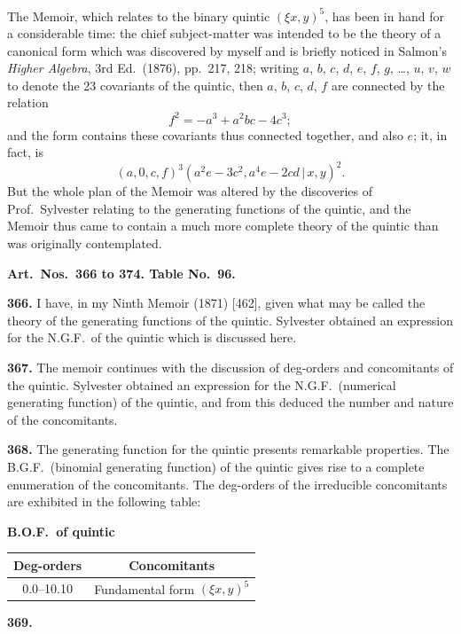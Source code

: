 \documentclass[12pt,a4paper]{article}
\theoremstyle{definition}
\begin{document}
The Memoir, which relates to the binary quintic $(\xi x, y)^5$, has been in hand for a considerable time: the chief subject-matter was intended to be the theory of a canonical form which was discovered by myself and is briefly noticed in Salmon's \textit{Higher Algebra}, 3rd Ed.\ (1876), pp.\ 217, 218; writing $a$, $b$, $c$, $d$, $e$, $f$, $g$, \dots, $u$, $v$, $w$ to denote the 23 covariants of the quintic, then $a$, $b$, $c$, $d$, $f$ are connected by the relation
\[
f^2 = -a^3 + a^2bc - 4c^3;
\]
and the form contains these covariants thus connected together, and also $e$; it, in fact, is
\[
(a, 0, c, f)^3(a^2e - 3c^2, a^4e - 2cd\,|\,x, y)^2.
\]
But the whole plan of the Memoir was altered by the discoveries of Prof.\ Sylvester relating to the generating functions of the quintic, and the Memoir thus came to contain a much more complete theory of the quintic than was originally contemplated.

\medskip
\noindent\textbf{Art.\ Nos.\ 366 to 374. Table No.\ 96.}

\medskip
\noindent\textbf{366.}\quad
I have, in my Ninth Memoir (1871) [462], given what may be called the theory of the generating functions of the quintic. Sylvester obtained an expression for the N.G.F.\ of the quintic which is discussed here.

\medskip
\noindent\textbf{367.}\quad
The memoir continues with the discussion of deg-orders and concomitants of the quintic. Sylvester obtained an expression for the N.G.F.\ (numerical generating function) of the quintic, and from this deduced the number and nature of the concomitants.

\medskip
\noindent\textbf{368.}\quad
The generating function for the quintic presents remarkable properties. The B.G.F.\ (binomial generating function) of the quintic gives rise to a complete enumeration of the concomitants. The deg-orders of the irreducible concomitants are exhibited in the following table:

\begin{center}
\textbf{B.O.F.\ of quintic}
\medskip
\begin{tabular}{|c|l|}
\hline
Deg-orders & \multicolumn{1}{c|}{Concomitants} \\
\hline
0.0--10.10 & Fundamental form $(\xi x, y)^5$ \\
\hline
\end{tabular}
\end{center}

\medskip
\noindent\textbf{369.}
\end{document}
